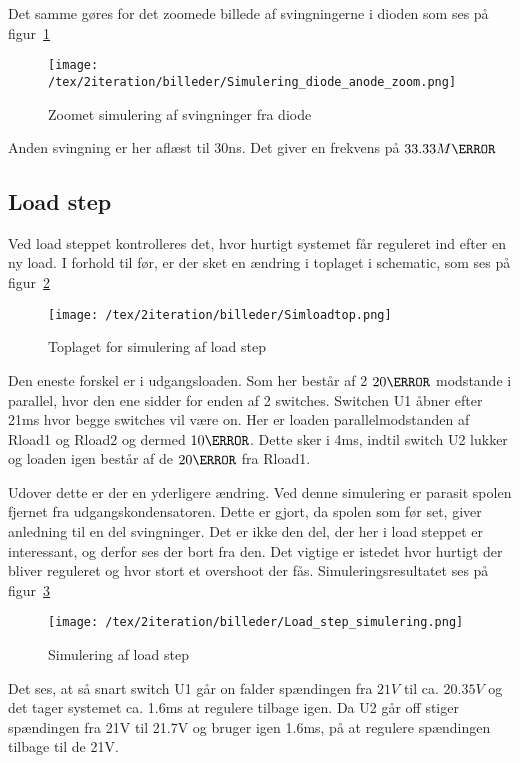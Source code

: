 Det samme gøres for det zoomede billede af svingningerne i dioden som ses på figur~\ref{fig: simdiodezoom} 
\begin{figure}[H]
	\center
	\texttt{[image: /tex/2iteration/billeder/Simulering\_diode\_anode\_zoom.png]}
	\caption{Zoomet simulering af svingninger fra diode}
	\label{fig: simdiodezoom}
\end{figure}
Anden svingning er her aflæst til 30ns. Det giver en frekvens på $33.33M\hertz$

\subsection{Load step}
Ved load steppet kontrolleres det, hvor hurtigt systemet får reguleret ind efter en ny load. I forhold til før, er der sket en ændring i toplaget i schematic, som ses på figur~\ref{fig: simloadtop}  
\begin{figure}[H]
	\center
	\texttt{[image: /tex/2iteration/billeder/Simloadtop.png]}
	\caption{Toplaget for simulering af load step}
	\label{fig: simloadtop}
\end{figure}
Den eneste forskel er i udgangsloaden. Som her består af 2 $20\ohm$ modstande i parallel, hvor den ene sidder for enden af 2 switches. Switchen U1 åbner efter 21ms hvor begge switches vil være on. Her er loaden parallelmodstanden af Rload1 og Rload2 og dermed $10\ohm$. Dette sker i 4ms, indtil switch U2 lukker og loaden igen består af de $20\ohm$ fra Rload1.

\noindent Udover dette er der en yderligere ændring. Ved denne simulering er parasit spolen fjernet fra udgangskondensatoren. Dette er gjort, da spolen som før set, giver anledning til en del svingninger. Det er ikke den del, der her i load steppet er interessant, og derfor ses der bort fra den. Det vigtige er istedet hvor hurtigt der bliver reguleret og hvor stort et overshoot der fås. Simuleringsresultatet ses på figur~\ref{fig: simloadstep} 

\begin{figure}[H]
	\center
	\texttt{[image: /tex/2iteration/billeder/Load\_step\_simulering.png]}
	\caption{Simulering af load step}
	\label{fig: simloadstep}
\end{figure}

Det ses, at så snart switch U1 går on falder spændingen fra $21V$ til ca. $20.35V$ og det tager systemet ca. 1.6ms at regulere tilbage igen. Da U2 går off stiger spændingen fra 21V til 21.7V og bruger igen 1.6ms, på at regulere spændingen tilbage til de 21V. 

